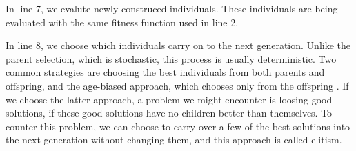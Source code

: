 In line 7, we evalute newly construced individuals. These individuals are being evaluated with the same fitness function used in line 2.

In line 8, we choose which individuals carry on to the next generation. Unlike the parent selection, which is stochastic, this process is usually deterministic. Two common strategies are choosing the best individuals from both parents and offspring, and the age-biased approach, which chooses only from the offspring \citep{eiben2015evolutionarycomputing}. If we choose the latter approach, a problem we might encounter is loosing good solutions, if these good solutions have no children better than themselves. To counter this problem, we can choose to carry over a few of the best solutions into the next generation without changing them, and this approach is called elitism.